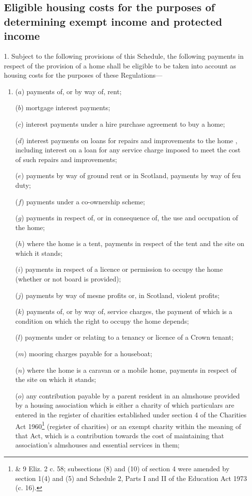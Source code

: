\documentclass[a4paper]{article}
\newcommand{\parthead}{}
\begin{document}
\renewcommand\parthead{--- Schedule 3}

\subsection*{Eligible housing costs for the purposes of determining exempt income and protected income}

1.  Subject to the following provisions of this Schedule, the following payments in respect of the provision of a home shall be eligible to be taken into account as housing costs for the purposes of these Regulations—
\begin{enumerate}\item[]
($a$) payments of, or by way of, rent;

($b$) mortgage interest payments;

($c$) interest payments under a hire purchase agreement to buy a home;

($d$) interest payments on loans for repairs and improvements to the home%
, including interest on a loan for any service charge imposed to meet the cost of such repairs and improvements; %

($e$) payments by way of ground rent or in Scotland, payments by way of feu duty;

($f$) payments under a co-ownership scheme;

($g$) payments in respect of, or in consequence of, the use and occupation of the home;

($h$) where the home is a tent, payments in respect of the tent and the site on which it stands;

($i$) payments in respect of a licence or permission to occupy the home (whether or not board is provided);

($j$) payments by way of mesne profits or, in Scotland, violent profits;

($k$) payments of, or by way of, service charges, the payment of which is a condition on which the right to occupy the home depends;

($l$) payments under or relating to a tenancy or licence of a Crown tenant;

($m$) mooring charges payable for a houseboat;

($n$) where the home is a caravan or a mobile home, payments in respect of the site on which it stands;

($o$) any contribution payable by a parent resident in an almshouse provided by a housing association which is either a charity of which particulars are entered in the register of charities established under section 4 of the Charities Act 1960\footnote{ \& 9 Eliz. 2 c. 58; subsections (8) and (10) of section 4 were amended by section 1(4) and (5) and Schedule 2, Parts I and II of the Education Act 1973 (c. 16).} (register of charities) or an exempt charity within the meaning of that Act, which is a contribution towards the cost of maintaining that association’s almshouses and essential services in them;


\end{enumerate}
\end{document}
